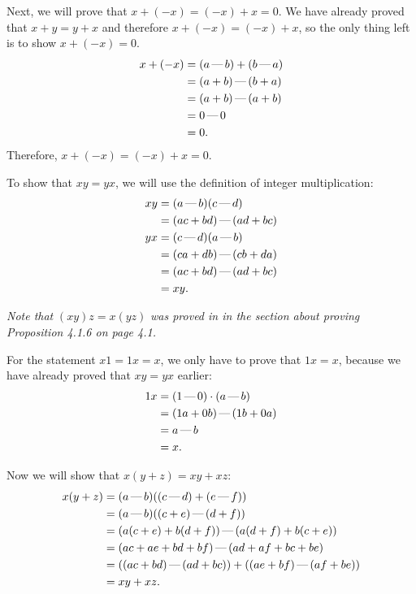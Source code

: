 \documentclass[12pt, oneside]{book}
\newcommand{\formalminus}{\, \text{\textemdash} \,}
\begin{document}
	Next, we will prove that $x + (-x) = (-x) + x = 0$. We have already proved that $x + y = y + x$ and therefore $x + (-x) = (-x) + x$, so the only thing left is to show $x + (-x) = 0$.
	\[\begin{split}
		x + (-x) &= (a \formalminus b) + (b \formalminus a) \\
		&= (a + b) \formalminus (b + a) \\
		&= (a + b) \formalminus (a + b) \\
		&= 0 \formalminus 0 \\
		&= 0.
	\end{split}\]
	Therefore, $x + (-x) = (-x) + x = 0$.
	
	To show that $xy = yx$, we will use the definition of integer multiplication:
	\begin{align*}
		xy &= (a \formalminus b)(c \formalminus d) \\
		&= (ac + bd) \formalminus (ad + bc) \\
		yx &= (c \formalminus d)(a \formalminus b) \\
		&= (ca + db) \formalminus (cb + da) \\
		&= (ac + bd) \formalminus (ad + bc) \\
		&= xy.
	\end{align*}
	
	\emph{Note that} $(xy)z = x(yz)$ \emph{was proved in in the section about proving Proposition 4.1.6 on page 4.1.}
	
	For the statement $x1 = 1x = x$, we only have to prove that $1x = x$, because we have already proved that $xy = yx$ earlier:
	\[\begin{split}
		1x &= (1 \formalminus 0) \cdot (a \formalminus b) \\
		&= (1a + 0b) \formalminus (1b + 0a) \\
		&= a \formalminus b \\
		&= x.
	\end{split}\]
	
	Now we will show that $x(y + z) = xy + xz$:
	\[\begin{split}
		x(y + z) &= (a \formalminus b)((c \formalminus d) + (e \formalminus f)) \\
		&= (a \formalminus b)((c + e) \formalminus (d + f)) \\
		&= (a(c + e) + b(d + f)) \formalminus (a(d + f) + b(c + e)) \\
		&= (ac + ae + bd + bf) \formalminus (ad + af + bc + be) \\
		&= ((ac + bd) \formalminus (ad + bc)) + ((ae + bf) \formalminus (af + be)) \\
		&= xy + xz.
	\end{split}\]
	
\end{document}
